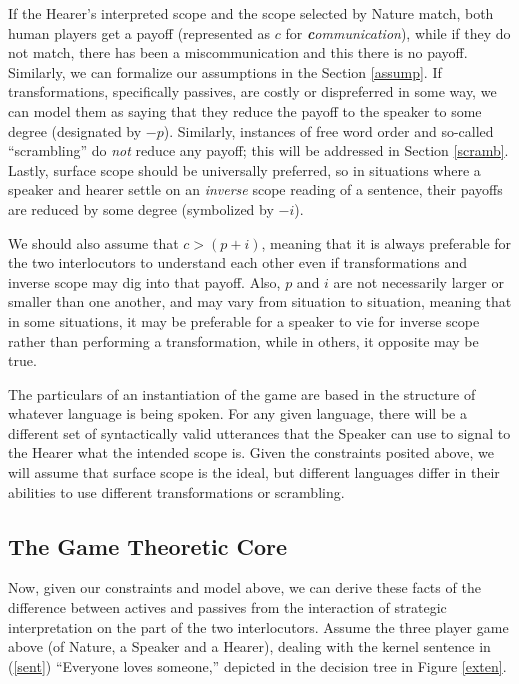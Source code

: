 \documentclass{article}
\begin{document}
If the Hearer's interpreted scope and the scope selected by Nature match, both human players get a payoff (represented as $c$ for \emph{\textbf{c}ommunication}), while if they do not match, there has been a miscommunication and this there is no payoff.
Similarly, we can formalize our assumptions in the Section \ref{assump}.
If transformations, specifically passives, are costly or dispreferred in some way, we can model them as saying that they reduce the payoff to the speaker to some degree (designated by $-p$).
Similarly, instances of free word order and so-called ``scrambling'' do \emph{not} reduce any payoff; this will be addressed in Section \ref{scramb}.
Lastly, surface scope should be universally preferred, so in situations where a speaker and hearer settle on an \emph{inverse} scope reading of a sentence, their payoffs are reduced by some degree (symbolized by $-i$).

We should also assume that $c > (p + i)$, meaning that it is always preferable for the two interlocutors to understand each other even if transformations and inverse scope may dig into that payoff.
Also, $p$ and $i$ are not necessarily larger or smaller than one another, and may vary from situation to situation, meaning that in some situations, it may be preferable for a speaker to vie for inverse scope rather than performing a transformation, while in others, it opposite may be true.

The particulars of an instantiation of the game are based in the structure of whatever language is being spoken.
For any given language, there will be a different set of syntactically valid utterances that the Speaker can use to signal to the Hearer what the intended scope is.
Given the constraints posited above, we will assume that surface scope is the ideal, but different languages differ in their abilities to use different transformations or scrambling.


\subsection{The Game Theoretic Core}

Now, given our constraints and model above, we can derive these facts of the difference between actives and passives from the interaction of strategic interpretation on the part of the two interlocutors.
Assume the three player game above (of Nature, a Speaker and a Hearer), dealing with the kernel sentence in (\ref{sent}) ``Everyone loves someone,'' depicted in the decision tree in Figure \ref{exten}.
\end{document}
